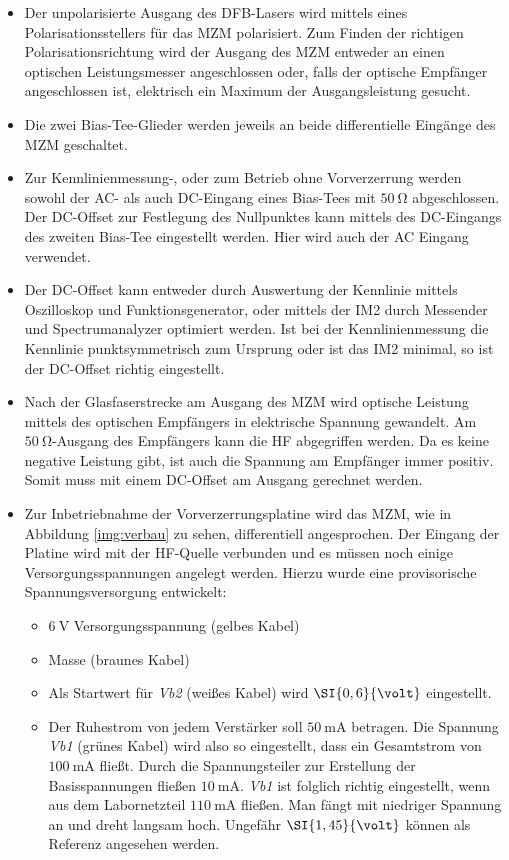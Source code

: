 \begin{itemize}
\item Der unpolarisierte Ausgang des \ac{DFB}-Lasers wird mittels eines Polarisationsstellers für das \ac{MZM} polarisiert. Zum Finden der richtigen Polarisationsrichtung wird der Ausgang des \ac{MZM} entweder an einen optischen Leistungsmesser angeschlossen oder, falls der optische Empfänger angeschlossen ist, elektrisch ein Maximum der Ausgangsleistung gesucht.
\item Die zwei Bias-Tee-Glieder werden jeweils an beide differentielle Eingänge des \ac{MZM} geschaltet.
\item Zur Kennlinienmessung-, oder zum Betrieb ohne Vorverzerrung werden sowohl der \ac{AC}- als auch \ac{DC}-Eingang eines Bias-Tees mit $\SI{50}{\ohm}$ abgeschlossen. Der \ac{DC}-Offset zur Festlegung des Nullpunktes kann mittels des \ac{DC}-Eingangs des zweiten Bias-Tee eingestellt werden. Hier wird auch der \ac{AC} Eingang verwendet.
\item Der \ac{DC}-Offset kann entweder durch Auswertung der Kennlinie mittels Oszilloskop und Funktionsgenerator, oder mittels der \ac{IM2} durch Messender und Spectrumanalyzer optimiert werden. Ist bei der Kennlinienmessung die Kennlinie punktsymmetrisch zum Ursprung oder ist das \ac{IM2} minimal, so ist der \ac{DC}-Offset richtig eingestellt.
\item Nach der Glasfaserstrecke am Ausgang des \ac{MZM} wird optische Leistung mittels des optischen Empfängers in elektrische Spannung gewandelt. Am $\SI{50}{\ohm}$-Ausgang des Empfängers kann die \ac{HF} abgegriffen werden. Da es keine negative Leistung gibt, ist auch die Spannung am Empfänger immer positiv. Somit muss mit einem \ac{DC}-Offset am Ausgang gerechnet werden.
\item Zur Inbetriebnahme der Vorverzerrungsplatine wird das \ac{MZM}, wie in Abbildung \ref{img:verbau} zu sehen, differentiell angesprochen. Der Eingang der Platine wird mit der \ac{HF}-Quelle verbunden und es müssen noch einige Versorgungsspannungen angelegt werden. Hierzu wurde eine provisorische Spannungsversorgung entwickelt:
\begin{itemize}
\item $\SI{6}{\volt}$ Versorgungsspannung (gelbes Kabel)
\item Masse (braunes Kabel)
\item Als Startwert für \textit{Vb2} (weißes Kabel) wird $\SI{0,{}6}{\volt}$ eingestellt.
\item Der Ruhestrom von jedem Verstärker soll $\SI{50}{\milli\ampere}$ betragen. Die Spannung \textit{Vb1} (grünes Kabel) wird also so eingestellt, dass ein Gesamtstrom von $\SI{100}{\milli\ampere}$ fließt. Durch die Spannungsteiler zur Erstellung der Basisspannungen fließen $\SI{10}{\milli\ampere}$. \textit{Vb1} ist folglich richtig eingestellt, wenn aus dem Labornetzteil $\SI{110}{\milli\ampere}$ fließen. Man fängt mit niedriger Spannung an und dreht langsam hoch. Ungefähr $\SI{1,{}45}{\volt}$ können als Referenz angesehen werden.

\end{itemize}
\end{itemize}
